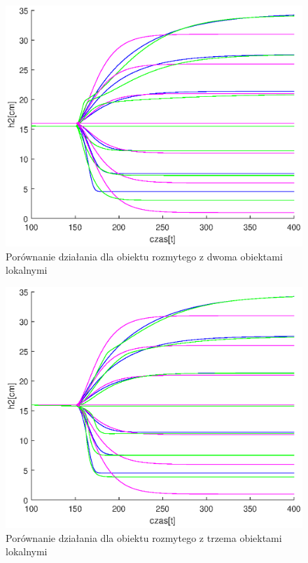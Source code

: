 		\begin{figure}[h!]
			\includegraphics[width=0.9\linewidth]{plots/z2_modelroz_2p.eps}
			\caption{Porównanie działania dla obiektu rozmytego z dwoma obiektami lokalnymi}
			\label{rys:roz2p}
		\end{figure}
		\begin{figure}[h!]
			\includegraphics[width=0.9\linewidth]{plots/z2_modelroz_3p.eps}
			\caption{Porównanie działania dla obiektu rozmytego z trzema obiektami lokalnymi}
			\label{rys:roz3p}
		\end{figure}
